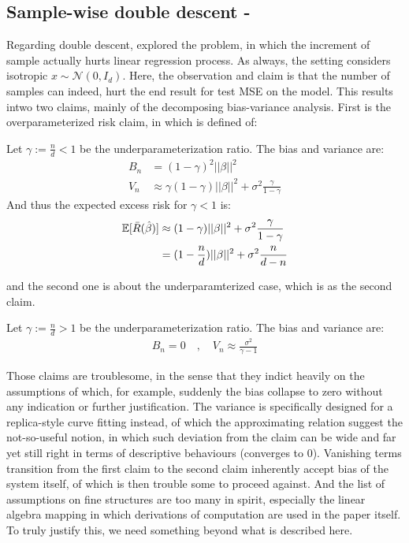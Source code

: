 \subsection{Sample-wise double descent - \cite{nakkiran2019moredata}}

Regarding double descent, \cite{nakkiran2019moredata} explored the problem, in which the increment of sample actually hurts linear regression process. As always, the setting considers isotropic $x\sim\mathcal{N}(0,I_{d})$. Here, the observation and claim is that the number of samples can indeed, hurt the end result for test MSE on the model. This results intwo two claims, mainly of the decomposing bias-variance analysis. First is the overparameterized risk claim, in which is defined of:

\begin{claim}
\label{claim:main}
Let $\gamma := \frac{n}{d} < 1$ be the underparameterization ratio.
The bias and variance are:
\begin{align}
B_n &= (1-\gamma)^2||\beta||^2\\
V_n &\approx \gamma(1-\gamma)||\beta||^2
+ \sigma^2 \frac{\gamma}{1-\gamma}
\end{align}
And thus the expected excess risk for $\gamma < 1$ is:
\begin{align}
\mathbb{E}[\bar R (\hat{\beta}) ]
&\approx (1-\gamma)||\beta||^2
+ \sigma^2 \frac{\gamma}{1-\gamma}\\
&= (1-\frac{n}{d})||\beta||^2
+ \sigma^2 \frac{n}{d-n}
\end{align}
\end{claim}
and the second one is about the underparamterized case, which is as the second claim. 
\begin{claim}
\label{claim:underparam}
Let $\gamma := \frac{n}{d} > 1$ be the underparameterization ratio.
The bias and variance are:
\begin{align*}
B_n = 0 \quad, \quad
V_n \approx \frac{\sigma^2}{\gamma - 1}
\end{align*}
\end{claim}

Those claims are troublesome, in the sense that they indict heavily on the assumptions of which, for example, suddenly the bias collapse to zero without any indication or further justification. The variance is specifically designed for a replica-style curve fitting instead, of which the approximating relation suggest the not-so-useful notion, in which such deviation from the claim can be wide and far yet still right in terms of descriptive behaviours (converges to $0$). Vanishing terms transition from the first claim to the second claim inherently accept bias of the system itself, of which is then trouble some to proceed against. And the list of assumptions on fine structures are too many in spirit, especially the linear algebra mapping in which derivations of computation are used in the paper itself. To truly justify this, we need something beyond what is described here. 

